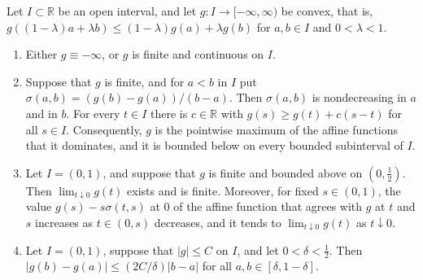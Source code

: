 \begin{lemma}\label{lem:one-variable-convex-functions}
Let $I\subset\mathbb R$ be an open interval, and let $g\colon I\to[-\infty,\infty)$ be convex, that is, $g((1-\lambda)a+\lambda b)\leq(1-\lambda)g(a)+\lambda g(b)$ for $a,b\in I$ and $0<\lambda<1$.
\begin{enumerate}
 \item Either $g\equiv-\infty$, or $g$ is finite and continuous on $I$.
 \item Suppose that $g$ is finite, and for $a<b$ in $I$ put $\sigma(a,b)=(g(b)-g(a))/(b-a)$. Then $\sigma(a,b)$ is nondecreasing in $a$ and in $b$. For every $t\in I$ there is $c\in\mathbb R$ with $g(s)\geq g(t)+c(s-t)$ for all $s\in I$. Consequently, $g$ is the pointwise maximum of the affine functions that it dominates, and it is bounded below on every bounded subinterval of $I$.
 \item Let $I=(0,1)$, and suppose that $g$ is finite and bounded above on $(0,\frac12)$. Then $\lim_{t\downarrow0}g(t)$ exists and is finite. Moreover, for fixed $s\in(0,1)$, the value $g(s)-s\sigma(t,s)$ at $0$ of the affine function that agrees with $g$ at $t$ and $s$ increases as $t\in(0,s)$ decreases, and it tends to $\lim_{t\downarrow0}g(t)$ as $t\downarrow0$.
 \item Let $I=(0,1)$, suppose that $|g|\leq C$ on $I$, and let $0<\delta<\frac12$. Then $|g(b)-g(a)|\leq(2C/\delta)|b-a|$ for all $a,b\in[\delta,1-\delta]$.
\end{enumerate}
\end{lemma}
